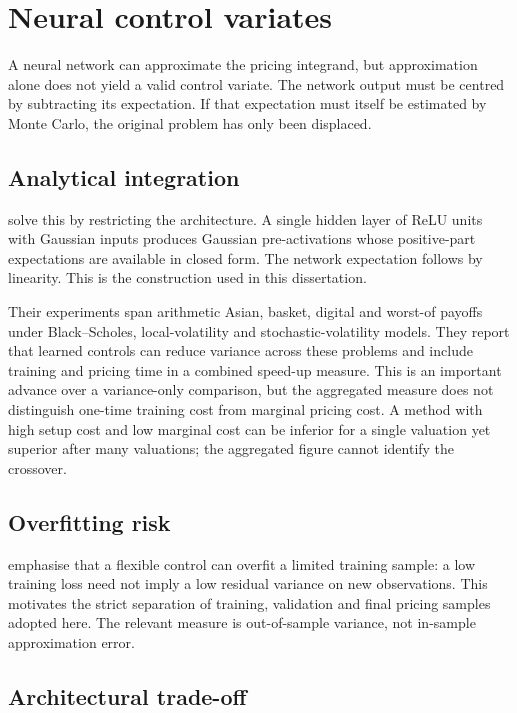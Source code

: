 \section{Neural control variates}

A neural network can approximate the pricing integrand, but approximation alone does not yield a valid control variate. The network output must be centred by subtracting its expectation. If that expectation must itself be estimated by Monte Carlo, the original problem has only been displaced.

\subsection{Analytical integration}

\textcite{el_filali_ech-chafiq_lelong_reghai_2021} solve this by restricting the architecture. A single hidden layer of ReLU units with Gaussian inputs produces Gaussian pre-activations whose positive-part expectations are available in closed form. The network expectation follows by linearity. This is the construction used in this dissertation.

Their experiments span arithmetic Asian, basket, digital and worst-of payoffs under Black--Scholes, local-volatility and stochastic-volatility models. They report that learned controls can reduce variance across these problems and include training and pricing time in a combined speed-up measure. This is an important advance over a variance-only comparison, but the aggregated measure does not distinguish one-time training cost from marginal pricing cost. A method with high setup cost and low marginal cost can be inferior for a single valuation yet superior after many valuations; the aggregated figure cannot identify the crossover.

\subsection{Overfitting risk}

\textcite{wan_zhong_xiong_zhu_2020} emphasise that a flexible control can overfit a limited training sample: a low training loss need not imply a low residual variance on new observations. This motivates the strict separation of training, validation and final pricing samples adopted here. The relevant measure is out-of-sample variance, not in-sample approximation error.

\subsection{Architectural trade-off}

